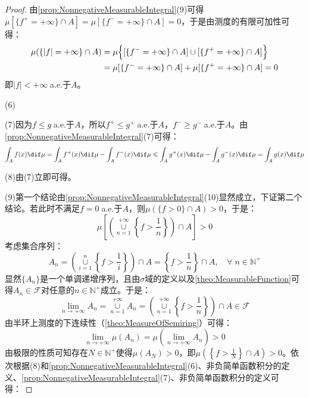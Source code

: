 \begin{proof}
	由\cref{prop:NonnegativeMeasurableIntegral}(9)可得$\mu[\{f^+=+\infty\}\cap A]=\mu[\{f^-=+\infty\}\cap A]=0$，于是由测度的有限可加性可得：
	\begin{align*}
		\mu(\{|f|=+\infty\}\cap A)&=\mu\Bigl\{[\{f^-=+\infty\}\cap A]\cup[\{f^+=+\infty\}\cap A]\Bigr\} \\
		&=\mu[\{f^-=+\infty\}\cap A]+\mu[\{f^+=+\infty\}\cap A]=0
	\end{align*}
	即$|f|<+\infty\;$a.e.于$A$。\par
	(6)\par
	(7)因为$f\leqslant g\;$a.e.于$A$，所以$f^+\leqslant g^+\;$a.e.于$A$，$f^-\geqslant g^-\;$a.e.于$A$。由\cref{prop:NonnegativeMeasurableIntegral}(7)可得：
	\begin{equation*}
		\int_{A}f(x)\dif\mu=\int_{A}f^+(x)\dif\mu-\int_{A}f^-(x)\dif\mu\leqslant\int_{A}g^+(x)\dif\mu-\int_{A}g^-(x)\dif\mu=\int_{A}g(x)\dif\mu
	\end{equation*}
	\par
	(8)由(7)立即可得。\par
	(9)第一个结论由\cref{prop:NonnegativeMeasurableIntegral}(10)显然成立，下证第二个结论。若此时不满足$f=0\;$a.e.于$A$，则$\mu(\{f>0\}\cap A)>0$，于是：
	\begin{equation*}
		\mu\left[\left(\underset{n=1}{\overset{+\infty}{\cup}}\left\{f>\frac{1}{n}\right\}\right)\cap A\right]>0
	\end{equation*}
	考虑集合序列：
	\begin{equation*}
		A_n=\left(\underset{i=1}{\overset{n}{\cup}}\left\{f>\frac{1}{i}\right\}\right)\cap A=\left\{f>\frac{1}{n}\right\}\cap A,\quad\forall\;n\in\mathbb{N}^+
	\end{equation*}
	显然$\{A_n\}$是一个单调递增序列，且由$\sigma$域的定义以及\cref{theo:MeasurableFunction}可得$A_n\in\mathscr{F}$对任意的$n\in\mathbb{N}^+$成立。于是：
	\begin{equation*}
		\lim_{n\to+\infty}A_n=\underset{n=1}{\overset{+\infty}{\cup}}A_n=\left(\underset{n=1}{\overset{+\infty}{\cup}}\left\{f>\frac{1}{n}\right\}\right)\cap A\in\mathscr{F}
	\end{equation*}
	由半环上测度的下连续性（\cref{theo:MeasureOfSemiring}）可得：
	\begin{equation*}
		\lim_{n\to+\infty}\mu(A_n)=\mu\left(\lim_{n\to+\infty}A_n\right)>0
	\end{equation*}
	由极限的性质可知存在$N\in\mathbb{N}^+$使得$\mu(A_N)>0$，即$\mu\left(\left\{f>\frac{1}{N}\right\}\cap A\right)>0$。依次根据(8)和\cref{prop:NonnegativeMeasurableIntegral}(6)、非负简单函数积分的定义、\cref{prop:NonnegativeMeasurableIntegral}(7)、非负简单函数积分的定义可得：

\end{proof}

